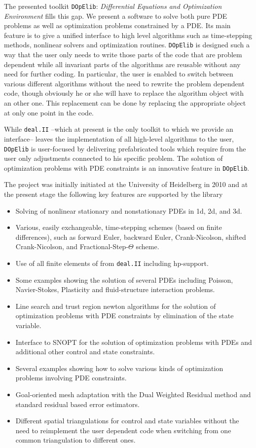 \documentclass[smallextended]{svjour3}       %
\numberwithin{equation}{section}
\newcommand{\deal}{\texttt{deal.II}}
\newcommand{\dope}{\texttt{DOpElib}}
\begin{document}
The presented toolkit \dope{}: 
\textit{Differential Equations and Optimization Environment} \cite{dope}
fills this gap. We present a software
to solve both pure PDE problems as well as optimization problems 
constrained by a PDE. 
Its main feature is to give a unified interface to high level algorithms such as 
time-stepping methods, nonlinear solvers and optimization routines. 
\dope{} is designed such a way that the user only needs to write those parts
of the code that are problem dependent while all invariant 
parts of the algorithms
are reusable without any need for further coding.
In particular, the user is enabled to switch between various different 
algorithms without the need to rewrite the problem dependent code, 
though obviously he or she will
have to replace the algorithm object with an other one. 
This replacement can be done by replacing the appropriate object at only
one point in the code.

While \deal{} --which at present is the only toolkit to which we provide an 
interface-- leaves the implementation of all high-level algorithms to the user, 
\dope{} is user-focused by delivering
prefabricated tools which require from the user only adjustments connected
to his specific problem. The solution of optimization problems with PDE
constraints is an innovative feature in \dope{}.

The project was initially initiated at the University of Heidelberg in 2010 and  
at the present stage the following key features are supported by the library
\begin{itemize}
\item Solving of nonlinear stationary and nonstationary PDEs in 1d, 2d, and 3d.
\item Various, easily exchangeable, 
  time-stepping schemes (based on finite differences), 
  such as forward Euler, backward Euler,
  Crank-Nicolson, shifted Crank-Nicolson, and Fractional-Step-$\Theta$ scheme.
\item Use of all finite elements of from \deal{} including hp-support.
\item Some examples showing the solution of several PDEs including
   Poisson, Navier-Stokes, Plasticity and fluid-structure interaction problems. 
\item Line search and trust region newton algorithms for the 
   solution of optimization problems with PDE constraints by elimination of 
   the state variable.
\item Interface to SNOPT for the solution of optimization problems with PDEs and
  additional other control and state constraints.
\item Several examples showing how to solve various kinds of optimization 
  problems involving PDE constraints.
\item Goal-oriented mesh adaptation with the Dual Weighted Residual method and
  standard residual based error estimators.
\item Different spatial triangulations for control and state variables without
  the need to reimplement the user dependent code when switching from one common 
  triangulation to different ones.
\end{itemize}
\end{document}
